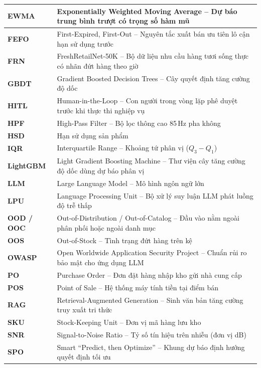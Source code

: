 \begin{longtable}{|L{3.4cm}|L{11.1cm}|}
\hline
\textbf{EWMA} & Exponentially Weighted Moving Average -- Dự báo trung bình trượt có trọng số hàm mũ \\
\hline
\textbf{FEFO} & First-Expired, First-Out -- Nguyên tắc xuất bán ưu tiên lô cận hạn sử dụng trước \\
\hline
\textbf{FRN} & FreshRetailNet-50K -- Bộ dữ liệu nhu cầu hàng tươi sống thực có nhãn đứt hàng theo giờ \\
\hline
\textbf{GBDT} & Gradient Boosted Decision Trees -- Cây quyết định tăng cường độ dốc \\
\hline
\textbf{HITL} & Human-in-the-Loop -- Con người trong vòng lặp phê duyệt trước khi thực thi nghiệp vụ \\
\hline
\textbf{HPF} & High-Pass Filter -- Bộ lọc thông cao 85\,Hz pha không \\
\hline
\textbf{HSD} & Hạn sử dụng sản phẩm \\
\hline
\textbf{IQR} & Interquartile Range -- Khoảng tứ phân vị ($Q_3 - Q_1$) \\
\hline
\textbf{LightGBM} & Light Gradient Boosting Machine -- Thư viện cây tăng cường độ dốc dùng dự báo phân vị \\
\hline
\textbf{LLM} & Large Language Model -- Mô hình ngôn ngữ lớn \\
\hline
\textbf{LPU} & Language Processing Unit -- Bộ xử lý suy luận LLM phát luồng độ trễ thấp \\
\hline
\textbf{OOD / OOC} & Out-of-Distribution / Out-of-Catalog -- Đầu vào nằm ngoài phân phối hoặc ngoài danh mục \\
\hline
\textbf{OOS} & Out-of-Stock -- Tình trạng đứt hàng trên kệ \\
\hline
\textbf{OWASP} & Open Worldwide Application Security Project -- Chuẩn rủi ro bảo mật cho ứng dụng LLM \\
\hline
\textbf{PO} & Purchase Order -- Đơn đặt hàng nhập kho gửi nhà cung cấp \\
\hline
\textbf{POS} & Point of Sale -- Hệ thống máy tính tiền tại điểm bán \\
\hline
\textbf{RAG} & Retrieval-Augmented Generation -- Sinh văn bản tăng cường truy xuất tri thức \\
\hline
\textbf{SKU} & Stock-Keeping Unit -- Đơn vị mã hàng lưu kho \\
\hline
\textbf{SNR} & Signal-to-Noise Ratio -- Tỷ số tín hiệu trên nhiễu (đơn vị dB) \\
\hline
\textbf{SPO} & Smart ``Predict, then Optimize'' -- Khung dự báo định hướng quyết định tối ưu \\

\end{longtable}

